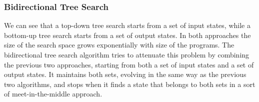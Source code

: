 \subsubsection{Bidirectional Tree Search}
\label{sec:bidirectional-search}

We can see that a top-down tree search starts from a set of input states, while
a bottom-up tree search starts from a set of output states.
In both approaches the size of the search space grows exponentially with size of
the programs.
The bidirectional tree search algorithm tries to attenuate this problem by
combining the previous two approaches, starting from both a set of input states
and a set of output states.
It maintains both sets, evolving in the same way as the previous two
algorithms, and stops when it finds a state that belongs to both sets in a
sort of meet-in-the-middle approach.
